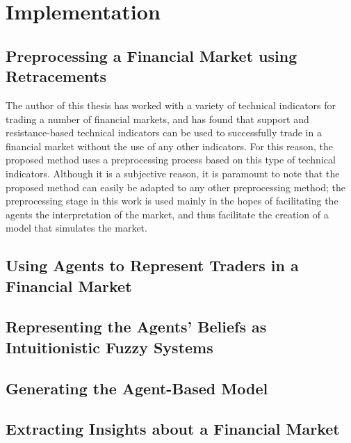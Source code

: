 \chapter{Implementation}
\label{chapter:implementation}

\section{Preprocessing a Financial Market using Retracements}
\label{section:preprocessing-a-financial-market-using-retracements:implementation}

The author of this thesis has worked with a variety of technical indicators for
trading a number of financial markets, and has found that support and
resistance-based technical indicators can be used to successfully trade in a
financial market without the use of any other indicators. For this reason, the
proposed method uses a preprocessing process based on this type of technical
indicators. Although it is a subjective reason, it is paramount to note that the
proposed method can easily be adapted to any other preprocessing method; the
preprocessing stage in this work is used mainly in the hopes of facilitating the
agents the interpretation of the market, and thus facilitate the creation of a
model that simulates the market.

\section{Using Agents to Represent Traders in a Financial Market}
\label{section:using-agents-to-represent-traders-in-a-financial-market:implementation}

\section{Representing the Agents' Beliefs as Intuitionistic Fuzzy Systems}
\label{section:representing-the-agents-beliefs-as-intuitionistic-fuzzy-systems}

\section{Generating the Agent-Based Model}
\label{section:generating-the-agent-based-model}

\section{Extracting Insights about a Financial Market}
\label{section:extracting-insights-about-a-financial-market}
